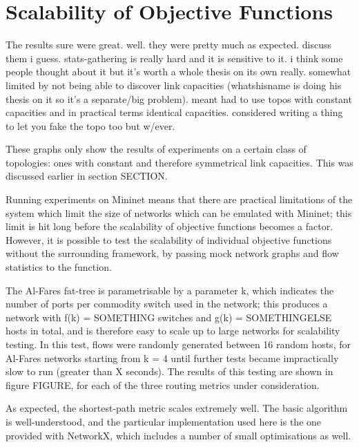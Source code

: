 \section{Scalability of Objective Functions}
The results sure were great.
well. they were pretty much as expected. discuss them i guess.
stats-gathering is really hard and it is sensitive to it. i think some people thought
about it but it's worth a whole thesis on its own really.
somewhat limited by not being able to discover link capacities (whatshisname is
doing his thesis on it so it’s a separate/big problem). meant had to use topos with
constant capacities and in practical terms identical capacities. considered writing a
thing to let you fake the topo too but w/ever.

These graphs only show the results of experiments on a certain class of topologies: ones with constant and therefore symmetrical link capacities. This was discussed earlier in section SECTION.


Running experiments on Mininet means that there are practical limitations of the system which limit the size of networks which can be emulated with Mininet; this limit is hit long before the scalability of objective functions becomes a factor. However, it is possible to test the scalability of individual objective functions without the surrounding framework, by passing mock network graphs and flow statistics to the function. 

The Al-Fares fat-tree is parametrisable by a parameter k, which indicates the number of ports per commodity switch used in the network; this produces a network with f(k) = SOMETHING switches and g(k) = SOMETHINGELSE hosts in total, and is therefore easy to scale up to large networks for scalability testing. In this test, flows were randomly generated between 16 random hosts, for Al-Fares networks starting from k = 4 until further tests became impractically slow to run (greater than X seconds).  The results of this testing are shown in figure FIGURE, for each of the three routing metrics under consideration.

As expected, the shortest-path metric scales extremely well. The basic algorithm is well-understood, and the particular implementation used here is the one provided with NetworkX, which includes a number of small optimisations as well.

